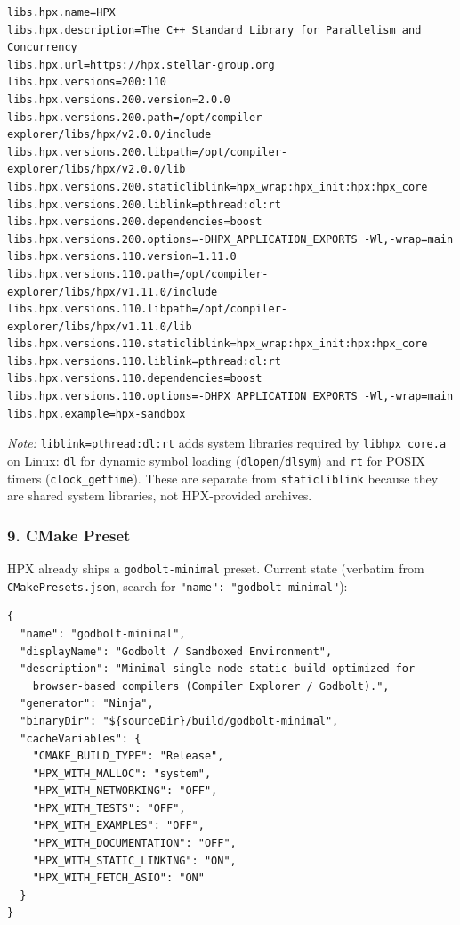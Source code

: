 \documentclass[11pt, a4paper]{article}
\newcommand{\code}[1]{\texttt{#1}}
\newcommand{\cefile}[1]{\texttt{#1}}
\begin{document}
\begin{lstlisting}[language={}, caption={Proposed c++.amazon.properties}]
libs.hpx.name=HPX
libs.hpx.description=The C++ Standard Library for Parallelism and Concurrency
libs.hpx.url=https://hpx.stellar-group.org
libs.hpx.versions=200:110
libs.hpx.versions.200.version=2.0.0
libs.hpx.versions.200.path=/opt/compiler-explorer/libs/hpx/v2.0.0/include
libs.hpx.versions.200.libpath=/opt/compiler-explorer/libs/hpx/v2.0.0/lib
libs.hpx.versions.200.staticliblink=hpx_wrap:hpx_init:hpx:hpx_core
libs.hpx.versions.200.liblink=pthread:dl:rt
libs.hpx.versions.200.dependencies=boost
libs.hpx.versions.200.options=-DHPX_APPLICATION_EXPORTS -Wl,-wrap=main
libs.hpx.versions.110.version=1.11.0
libs.hpx.versions.110.path=/opt/compiler-explorer/libs/hpx/v1.11.0/include
libs.hpx.versions.110.libpath=/opt/compiler-explorer/libs/hpx/v1.11.0/lib
libs.hpx.versions.110.staticliblink=hpx_wrap:hpx_init:hpx:hpx_core
libs.hpx.versions.110.liblink=pthread:dl:rt
libs.hpx.versions.110.dependencies=boost
libs.hpx.versions.110.options=-DHPX_APPLICATION_EXPORTS -Wl,-wrap=main
libs.hpx.example=hpx-sandbox
\end{lstlisting}

\noindent\textit{Note:} \code{liblink=pthread:dl:rt} adds system libraries
required by \code{libhpx\_core.a} on Linux: \code{dl} for dynamic symbol
loading (\code{dlopen}/\code{dlsym}) and \code{rt} for POSIX timers
(\code{clock\_gettime}).  These are separate from \code{staticliblink}
because they are shared system libraries, not HPX-provided archives.

\subsubsection*{9. CMake Preset}

HPX already ships a \code{godbolt-minimal} preset.  Current state
(verbatim from \cefile{CMakePresets.json}, search for
\code{"name": "godbolt-minimal"}):

\begin{lstlisting}[language={}, caption={Current godbolt-minimal preset (HPX source, verbatim)}]
{
  "name": "godbolt-minimal",
  "displayName": "Godbolt / Sandboxed Environment",
  "description": "Minimal single-node static build optimized for
    browser-based compilers (Compiler Explorer / Godbolt).",
  "generator": "Ninja",
  "binaryDir": "${sourceDir}/build/godbolt-minimal",
  "cacheVariables": {
    "CMAKE_BUILD_TYPE": "Release",
    "HPX_WITH_MALLOC": "system",
    "HPX_WITH_NETWORKING": "OFF",
    "HPX_WITH_TESTS": "OFF",
    "HPX_WITH_EXAMPLES": "OFF",
    "HPX_WITH_DOCUMENTATION": "OFF",
    "HPX_WITH_STATIC_LINKING": "ON",
    "HPX_WITH_FETCH_ASIO": "ON"
  }
}
\end{lstlisting}
\end{document}
